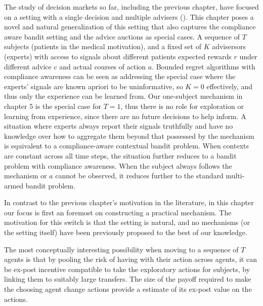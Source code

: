 The study of decision markets so far, including the previous chapter, have focused on a setting with a single decision and multiple advisers (\cite{hanson2002decision,othman2010decision,chen2014eliciting}).
This chapter poses a novel and natural generalization of this setting that also captures the compliance aware bandit setting and the advice auctions as special cases. 
A sequence of $T$ subjects (patients in the medical motivation), and a fixed set of $K$ advisersors (experts) with access to signals about different patients expected rewards $r$ under different advice $c$ and actual courses of action $a$. 
Bounded regret algorithms with compliance awareness can be seen as addressing the special case where the experts' signals are known apriori to be uninformative, so $K=0$ effectively, and thus only the experience can be learned from.
Our one-subject mechanism in chapter 5 is the special case for $T={1}$, thus there is no role for exploration or learning from experience, since there are no future decisions to help inform.
A situation where experts always report their signals truthfully and have no knowledge over how to aggregate them beyond that possessed by the mechanism is equivalent to a compliance-aware contextual bandit problem. 
When contexts are constant across all time steps, the situation further reduces to a bandit problem with compliance awareness.
When the subject always follows the mechanism or $a$ cannot be observed, it reduces further  to the standard multi-armed bandit problem. 


In contrast to the previous chapter's motivation in the literature, in this chapter our focus is first an foremost on constructing a practical mechanism. 
The motivation for this switch is that the setting is natural, and no mechanisms (or the setting itself) have been previously proposed to the best of our knowledge.



The most conceptually interesting possibility when moving to a sequence of $T$ agents is that by pooling the risk of having with their action across agents, it can be ex-post incentive compatible to take the exploratory actions for subjects, by linking them to suitably large transfers. The size of the payoff required to make the choosing agent change actions provide a estimate of its ex-post value on the actions. 

